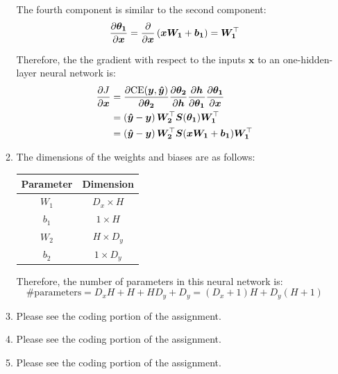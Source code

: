 \documentclass[10pt,reqno]{amsart}
\begin{document}
\begin{enumerate}[topsep=0pt,itemsep=2ex,partopsep=1ex,parsep=1ex]
\begin{enumerate}
    The fourth component is similar to the second component:
    \begin{equation*}
      \frac{\partial \bm{\theta_1}}{\partial \bm{x}} = \frac{\partial}{\partial \bm{x}} \left( \bm{x W_1} + \bm{b_1} \right) = \bm{W_1}^\top
    \end{equation*}

    Therefore, the the gradient with respect to the inputs $\bm{x}$ to an one-hidden-layer neural network is:
    \begin{align*}
      \frac{\partial J}{\partial \bm{x}}
      &= \frac{\partial \text{CE}(\bm{y}, \bm{\hat{y}})}{\partial \bm{\theta_2}} \frac{\partial \bm{\theta_2}}{\partial \bm{h}} \frac{\partial \bm{h}}{\partial \bm{\theta_1}} \frac{\partial \bm{\theta_1}}{\partial \bm{x}} \\
      &= \left( \bm{\hat{y}} - \bm{y} \right) \bm{W_2}^\top \bm{S}(\bm{\theta_1}) \bm{W_1}^\top \\
      &= \left( \bm{\hat{y}} - \bm{y} \right) \bm{W_2}^\top \bm{S}(\bm{x W_1} + \bm{b_1}) \bm{W_1}^\top
    \end{align*}

  \item
    The dimensions of the weights and biases are as follows:
    \vspace{1mm}
    \begin{center}
      \begin{tabular}{|c|c|}
        \hline
        Parameter & Dimension \\
        \hline
        $W_1$ & $D_x \times H$ \\
        $b_1$ & $1 \times H$ \\
        $W_2$ & $H \times D_y$ \\
        $b_2$ & $1 \times D_y$ \\
        \hline
      \end{tabular}
    \end{center}
    \vspace{1mm}
    Therefore, the number of parameters in this neural network is:
    \begin{equation*}
      \text{\# parameters} = D_x H + H + H D_y + D_y = (D_x + 1) H + D_y (H + 1)
    \end{equation*}

  \item Please see the coding portion of the assignment.
  \item Please see the coding portion of the assignment.
  \item Please see the coding portion of the assignment.
  \end{enumerate}



\end{enumerate}
\end{document}
